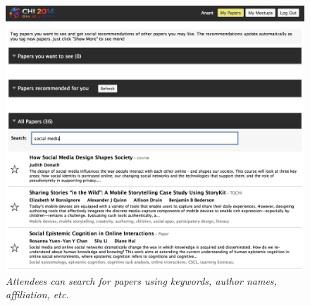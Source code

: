 \documentclass[letterpaper]{article}
\begin{document}
\begin{figure}[!h]
\centering
\includegraphics[width=0.9\columnwidth]{confer-search.png}
\caption{\emph{Attendees can search for papers using keywords, author names, affiliation, etc.}}
\label{confer-search}
\end{figure}
\end{document}
